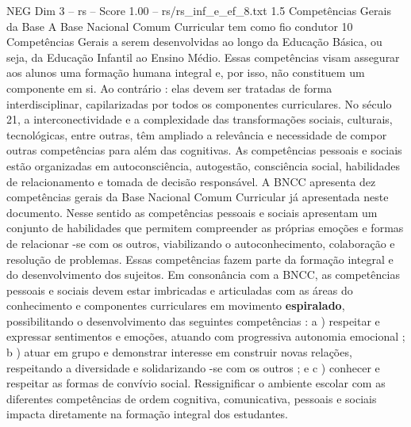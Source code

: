 \begin{textsample}{NEG Dim 3 – rs – Score 1.00 – rs/rs\_inf\_e\_ef\_8.txt}  \label{ex:f3_neg_045}
1.5 Competências Gerais da Base A Base Nacional Comum Curricular tem como fio condutor 10 Competências Gerais a serem desenvolvidas ao longo da Educação Básica, ou seja, da Educação Infantil ao Ensino Médio.
Essas competências visam assegurar aos alunos uma formação humana integral e, por isso, não constituem um componente em si.
Ao contrário : elas devem ser tratadas de forma interdisciplinar, capilarizadas por todos os componentes curriculares.
No século 21, a interconectividade e a complexidade das transformações sociais, culturais, tecnológicas, entre outras, têm ampliado a relevância e necessidade de compor outras competências para além das cognitivas.
As competências pessoais e sociais estão organizadas em autoconsciência, autogestão, consciência social, habilidades de relacionamento e tomada de decisão responsável.
A BNCC apresenta dez competências gerais da Base Nacional Comum Curricular já apresentada neste documento.
Nesse sentido as competências pessoais e sociais apresentam um conjunto de habilidades que permitem compreender as próprias emoções e formas de relacionar -se com os outros, viabilizando o autoconhecimento, colaboração e resolução de problemas.
Essas competências fazem parte da formação integral e do desenvolvimento dos sujeitos.
Em consonância com a BNCC, as competências pessoais e sociais devem estar imbricadas e articuladas com as áreas do conhecimento e componentes curriculares em movimento \textbf{espiralado}, possibilitando o desenvolvimento das seguintes competências : a ) respeitar e expressar sentimentos e emoções, atuando com progressiva autonomia emocional ; b ) atuar em grupo e demonstrar interesse em construir novas relações, respeitando a diversidade e solidarizando -se com os outros ; e c ) conhecer e respeitar as formas de convívio social.
Ressignificar o ambiente escolar com as diferentes competências de ordem cognitiva, comunicativa, pessoais e sociais impacta diretamente na formação integral dos estudantes.

\end{textsample}
